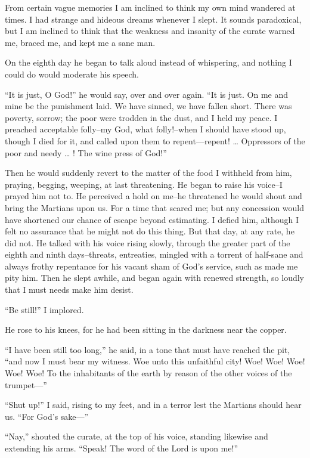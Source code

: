 From certain vague memories I am inclined to think my own mind
wandered at times. I had strange and hideous dreams whenever I
slept. It sounds paradoxical, but I am inclined to think that the
weakness and insanity of the curate warned me, braced me, and kept
me a sane man.

On the eighth day he began to talk aloud instead of whispering, and
nothing I could do would moderate his speech.

``It is just, O God!'' he would say, over and over again. ``It is
just. On me and mine be the punishment laid. We have sinned, we
have fallen short. There was poverty, sorrow; the poor were trodden
in the dust, and I held my peace. I preached acceptable folly--my
God, what folly!--when I should have stood up, though I died for
it, and called upon them to repent—repent! \ldots{} Oppressors of the
poor and needy \ldots{} ! The wine press of God!''

Then he would suddenly revert to the matter of the food I withheld
from him, praying, begging, weeping, at last threatening. He began
to raise his voice--I prayed him not to. He perceived a hold on
me--he threatened he would shout and bring the Martians upon us.
For a time that scared me; but any concession would have shortened
our chance of escape beyond estimating. I defied him, although I
felt no assurance that he might not do this thing. But that day, at
any rate, he did not. He talked with his voice rising slowly,
through the greater part of the eighth and ninth days--threats,
entreaties, mingled with a torrent of half-sane and always frothy
repentance for his vacant sham of God's service, such as made me
pity him. Then he slept awhile, and began again with renewed
strength, so loudly that I must needs make him desist.

``Be still!'' I implored.

He rose to his knees, for he had been sitting in the darkness near
the copper.

``I have been still too long,'' he said, in a tone that must have
reached the pit, ``and now I must bear my witness. Woe unto this
unfaithful city! Woe! Woe! Woe! Woe! Woe! To the inhabitants of the
earth by reason of the other voices of the trumpet---''

``Shut up!'' I said, rising to my feet, and in a terror lest the
Martians should hear us. ``For God's sake---''

``Nay,'' shouted the curate, at the top of his voice, standing
likewise and extending his arms. ``Speak! The word of the Lord is
upon me!''

